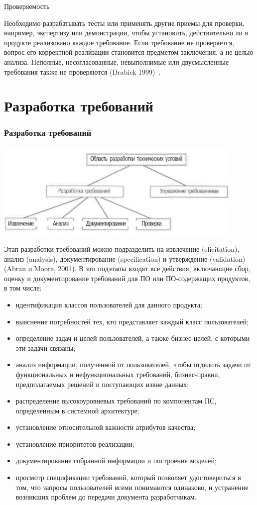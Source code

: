 \documentclass{../industrial-development}
\begin{document}
\alert{Проверяемость}

Необходимо разрабатывать тесты или применять другие приемы для проверки, например, экспертизу или демонстрации, чтобы
установить, действительно ли в продукте реализовано каждое требование. Если требование не проверяется, вопрос его корректной реализации становится предметом заключения, а не целью анализа. Неполные, несогласованные, невыполнимые или двусмысленные требования также не проверяются (Drabick 1999)~\cite[с.~24]{Wiegers}.


\section{Разработка требований}

\begin{frame} \frametitle{Разработка требований}
  \centerline{\includegraphics[width=0.9\textwidth]{pict3.pdf}}
\end{frame}

\lecturenotes

 Этап разработки требований можно подразделить на извлечение (elicitation), анализ (analysis), документирование (specification) и утверждение (validation) (Abran и Moore, 2001). В эти подэтапы входят все действия, включающие сбор, оценку и документирование требований для ПО или ПО-содержащих продуктов, в том числе:
	\begin{itemize}
\item идентификация классов пользователей для данного продукта;
\item выяснение потребностей тех, кто представляет каждый класс пользователей;
\item определение задач и целей пользователей, а также бизнес-целей, с которыми эти задачи связаны;
\item анализ информации, полученной от пользователей, чтобы отделить задачи от функциональных и нефункциональных требований, бизнес-правил, предполагаемых решений и поступающих извне данных;
\item распределение высокоуровневых требований по компонентам ПС, определенным в системной архитектуре;
\item установление относительной важности атрибутов качества;
\item установление приоритетов реализации;
\item документирование собранной информации и построение моделей;
\item просмотр спецификации требований, который позволяет удостовериться в том, что запросы пользователей всеми понимаются одинаково, и устранение возникших проблем до передачи документа разработчикам.
\end{itemize}
\end{document}
